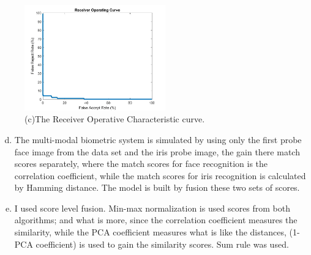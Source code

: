 \documentclass[a4paper]{article}
\begin{document}
\begin{spacing}{2.0}
\begin{figure}[H]
\begin{minipage}[t]{0.3\linewidth}
	\end{minipage}
	\begin{minipage}[t]{0.3\linewidth}
	\centering
	\includegraphics[width=2.4in]{Part3ROC.jpg}
	\caption{(c)The Receiver Operative Characteristic curve.}
	\label{ROC3}
	\end{minipage}
	\end{figure}
	
	\begin{enumerate}[(a)]
	\setcounter{enumi}{3}
	\item The multi-modal biometric system is simulated by using only the first probe face image from the data set and the iris probe image, the gain there match scores separately, where the match scores for face recognition is the correlation coefficient, while the match scores for iris recognition is calculated by Hamming distance. The model is built by fusion these two sets of scores.
	\item I used score level fusion. Min-max normalization is used scores from both algorithms; and what is more, since the correlation coefficient measures the similarity, while the PCA coefficient measures what is like the distances, (1-PCA coefficient) is used to gain the similarity scores. Sum rule was used.
	\end{enumerate}


\end{spacing}
\end{document}
